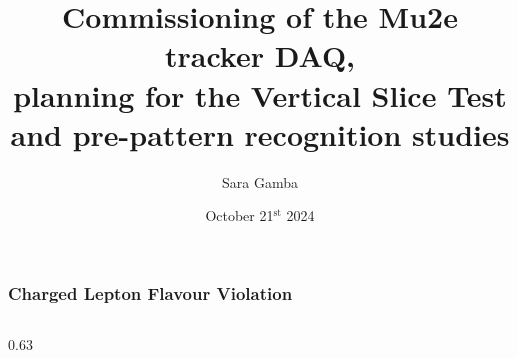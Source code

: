 \documentclass{beamer}
\title[Titolo breve]{Commissioning of the Mu2e tracker DAQ,\\ \vspace{1mm}planning for the Vertical Slice Test\\\vspace{1mm}and pre-pattern recognition studies}
\institute{Università di Pisa}
\author[Sara Gamba]{\small{Sara Gamba}}
\date[21/10/24]{\small{October 21$^{\text{st}}$ 2024}}
\begin{document}
	
\begin{frame}
\setTitlestyleDissertation
\maketitle
\end{frame}


\begin{frame}
    \frametitle{Charged Lepton Flavour Violation}
    \vspace{-2mm}
\begin{columns}
    \begin{column}{0.63\framewidth}
        \setlength{\leftmargini}{1.3em}


\end{column}
\end{columns}
\end{frame}
\end{document}
